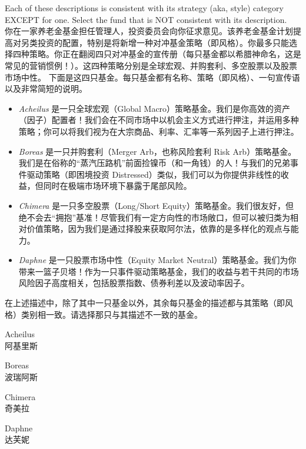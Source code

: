 \documentclass{article}
\newcounter{question} %
\begin{document}
\begin{question}
    Each of these descriptions is consistent with its strategy (aka, style) category EXCEPT for one. Select the fund that is NOT consistent with its description.\\
    你在一家养老金基金担任管理人，投资委员会向你征求意见。该养老金基金计划提高对另类投资的配置，特别是将新增一种对冲基金策略（即风格）。你最多只能选择四种策略。你正在翻阅四只对冲基金的宣传册（每只基金都以希腊神命名，这是常见的营销惯例！）。这四种策略分别是全球宏观、并购套利、多空股票以及股票市场中性。
    下面是这四只基金。每只基金都有名称、策略（即风格）、一句宣传语以及非常简短的说明。
    \begin{itemize}
    \item \textit{Acheilus} 是一只全球宏观（Global Macro）策略基金。我们是你高效的资产（因子）配置者！我们会在不同市场中以机会主义方式进行押注，并运用多种策略；你可以将我们视为在大宗商品、利率、汇率等一系列因子上进行押注。
    \item \textit{Boreas} 是一只并购套利（Merger Arb，也称风险套利 Risk Arb）策略基金。我们是在俗称的“蒸汽压路机”前面捡镍币（和一角钱）的人！与我们的兄弟事件驱动策略（即困境投资 Distressed）类似，我们可以为你提供非线性的收益，但同时在极端市场环境下暴露于尾部风险。
    \item \textit{Chimera} 是一只多空股票（Long/Short Equity）策略基金。我们很友好，但绝不会去“拥抱”基准！尽管我们有一定方向性的市场敞口，但可以被归类为相对价值策略，因为我们是通过择股来获取阿尔法，依靠的是多样化的观点与能力。
    \item \textit{Daphne} 是一只股票市场中性（Equity Market Neutral）策略基金。我们为你带来一篮子贝塔！作为一只事件驱动策略基金，我们的收益与若干共同的市场风险因子高度相关，包括股票指数、债券利差以及波动率因子。
    \end{itemize}
    在上述描述中，除了其中一只基金以外，其余每只基金的描述都与其策略（即风格）类别相一致。请选择那只与其描述不一致的基金。
\end{question}

\begin{choices}
    \item Acheilus\\
    阿基里斯
    \item Boreas\\
    波瑞阿斯
    \item Chimera\\
    奇美拉
    \item Daphne\\
    达芙妮
\end{choices}
\end{document}

